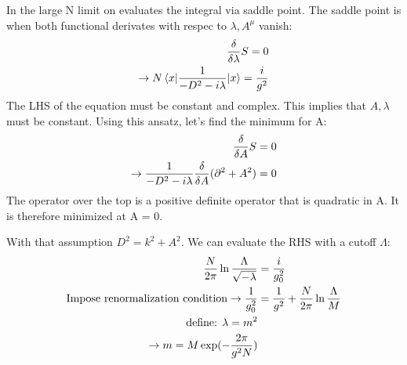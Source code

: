 \documentclass[9pt]{scrartcl}
\begin{document}
In the large N limit on evaluates the integral via saddle point. The saddle point is when both functional derivates with respec to $\lambda, A^\mu$ vanish:
\begin{align}
	{\delta \over \delta \lambda} S = 0 \\
	\rightarrow  N \braket{x|{1 \over -D^2 - i\lambda}|x} = {i \over g^2} \\
	\end{align}
The LHS of the equation must be constant and complex.  This implies that $A, \lambda$ must be constant.  Using this ansatz, let's find the minimum for A:
\begin{align}
	{\delta \over \delta A} S = 0 \\
	\rightarrow {1 \over -D^2 - i \lambda} {\delta \over \delta A} (\partial^2 + A^2) = 0
	\end{align}
The operator over the top is a positive definite operator that is quadratic in A.  It is therefore minimized at A = 0.

With that assumption $D^2 = k^2 + A^2$.  We can evaluate the RHS with a cutoff $\Lambda$:
\begin{align}
	{N \over 2 \pi} \ln {\Lambda \over \sqrt{ -  \lambda}} &= {i \over g_0^2} \\
	\text{Impose renormalization condition} \rightarrow
	{1 \over g_0^2} & = {1 \over g^2} + {N \over 2 \pi} \ln {\Lambda \over M} \\
	\text{define: }\lambda = m^2 \\
	\rightarrow m = M \exp(-{2 \pi \over g^2 N})
	\end{align}
\end{document}
